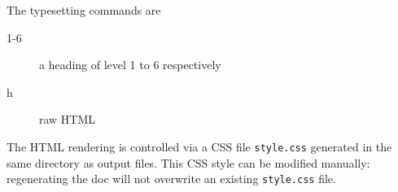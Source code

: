 The typesetting commands are
\begin{description}
\item[1-6] a heading of level 1 to 6 respectively
\item[h] raw HTML
\end{description}

The HTML rendering is controlled via a CSS file \verb|style.css|
generated in the same directory as output files. This CSS style can be
modified manually: regenerating the doc will not overwrite an existing
\verb|style.css| file.



